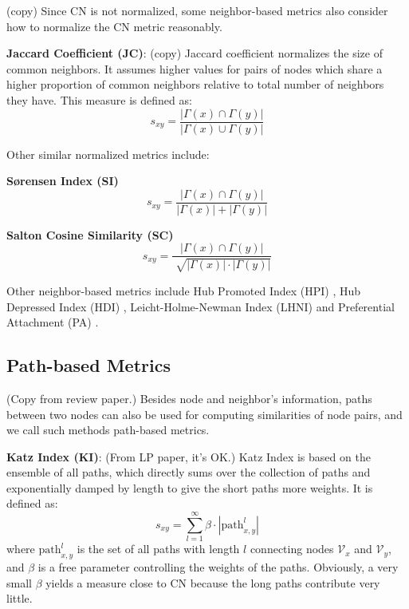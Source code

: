 \documentclass[\main/thesis.tex]{subfiles}
\begin{document}
(copy) Since CN is not normalized, some neighbor-based metrics also consider how to normalize the CN metric reasonably.

\textbf{Jaccard Coefficient (JC)}: (copy) Jaccard coefficient \cite{jaccard1901etude} normalizes the size of common neighbors. It assumes higher values for pairs of nodes which share a higher proportion of common neighbors relative to total number of neighbors they have. This measure is defined as:
\begin{equation}
s_{xy}=\frac{|\Gamma(x)\cap\Gamma(y)|}{|\Gamma(x)\cup\Gamma(y)|}
\end{equation}

Other similar normalized metrics include:

\textbf{S{\o}rensen Index (SI)} \cite{sorensen1948method}
\begin{equation}
s_{xy}=\frac{|\Gamma(x)\cap\Gamma(y)|}{|\Gamma(x)|+|\Gamma(y)|}
\end{equation}

\textbf{Salton Cosine Similarity (SC)} \cite{salton1986introduction}
\begin{equation}
s_{xy}=\frac{|\Gamma(x)\cap\Gamma(y)|}{\sqrt[]{|\Gamma(x)|\cdot|\Gamma(y)|}}
\end{equation}

Other neighbor-based metrics include Hub Promoted Index (HPI) \cite{ravasz2002hierarchical}, Hub Depressed Index (HDI) \cite{zhou2009predicting}, Leicht-Holme-Newman Index (LHNI) \cite{leicht2006vertex} and Preferential Attachment (PA) \cite{barabasi2002evolution}.
\subsection{Path-based Metrics}
(Copy from review paper.) Besides node and neighbor’s information, paths between two nodes can also be used for computing similarities of node pairs, and we call such methods path-based metrics.

\textbf{Katz Index (KI)}: (From LP paper, it's OK.) Katz Index \cite{katz1953new} is based on the ensemble of all paths, which directly sums over the collection of paths and exponentially damped by length to give the short paths more weights. It is defined as:
\begin{equation}
s_{xy} = \sum_{l=1}^{\infty}\beta \cdot |\text{path}_{x,y}^{l}|
\end{equation}
where $\text{path}_{x,y}^{l}$ is the set of all paths with length $l$ connecting nodes $\mathcal{V}_x$ and $\mathcal{V}_y$, and $\beta$ is a free parameter controlling the weights of the paths. Obviously, a very small $\beta$ yields a measure close to CN because the long paths contribute very little.
\end{document}
